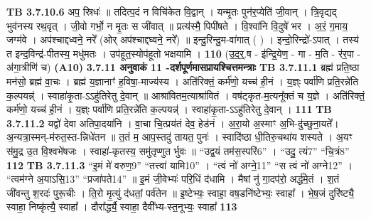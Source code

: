 \documentclass[17pt]{extarticle}
\begin{document}
{{{{{{{{{{{{{{{{{{{                  \newline
                                \textbf{ TB 3.7.10.6} \newline
                  अप॒ स्रिधः॑ ॥ तदित्प॒दं न विचि॑केत वि॒द्वान् । यन्मृ॒तः पुन॑र॒प्येति॑ जी॒वान् । त्रि॒वृद्यद् भुव॑नस्य रथ॒वृत् । जी॒वो गर्भो॒ न मृ॒तः स जी॑वात् ॥ प्रत्य॑स्मै॒ पिपी॑षते । वि॒श्वा॑नि वि॒दुषे॑ भर । अ॒रं॒ ग॒माय॒ जग्म॑वे । अप॑श्चाद्दध्वने॒ नरे᳚ (ओर् अप॑श्चाद्दघ्वने॒ नरे᳚) ॥ इन्दु॒रिन्दु॒म-वा॑गात् ( ) । इन्दो॒रिन्द्रो॑-ऽपात् । तस्य॑ त इन्द॒विन्द्र॑-पीतस्य॒ मधु॑मतः । उप॑हूत॒स्योप॑हूतो भक्षयामि । \textbf{ 110} \newline
                  \newline
                                    (उ॒द॒र्॒.ष - इ॑न्द्रि॒येण॒ - गा - म॒ति - र॑र॒पा - अ॑गा॒त्रीणि॑ च) \textbf{(A10)} \newline \newline
                \textbf{ 3.7.11    अनुवाकं   11 -दर्शपूर्णमासप्रायश्चित्तमन्त्राः} \newline
                                \textbf{ TB 3.7.11.1} \newline
                  ब्रह्म॑ प्रति॒ष्ठा मन॑सो॒ ब्रह्म॑ वा॒चः । ब्रह्म॑ य॒ज्ञानाꣳ॑ ह॒विषा॒-माज्य॑स्य । अति॑रिक्तं॒ कर्म॑णो॒ यच्च॑ ही॒नं । य॒ज्ञ्ः पर्वा॑णि प्रति॒रन्ने॑ति क॒ल्पयन्न्॑ । स्वाहा॑कृ॒ता-ऽऽहु॑तिरेतु दे॒वान् ॥ आश्रा॑वितम॒त्याश्रा॑वितं । वष॑ट्कृत-म॒त्यनू᳚क्तं च य॒ज्ञे । अति॑रिक्तं॒ कर्म॑णो॒ यच्च॑ ही॒नं । य॒ज्ञ्ः पर्वा॑णि प्रति॒रन्ने॑ति क॒ल्पयन्न्॑ । स्वाहा॑कृ॒ता-ऽऽहु॑तिरेतु दे॒वान् । \textbf{ 111} \newline
                  \newline
                                \textbf{ TB 3.7.11.2} \newline
                  यद्वो॑ देवा अतिपा॒दया॑नि । वा॒चा चि॒त्प्रय॑तं देव॒ हेड॑नं । अ॒रा॒यो अ॒स्माꣳ अ॒भि-दु॑च्छुना॒यते᳚। अ॒न्यत्रा॒स्मन्-म॑रुत॒स्त-न्निधे॑तन ॥ त॒तं म॒ आप॒स्तदु॑ तायत॒ पुनः॑ । स्वादि॑ष्ठा धी॒तिरु॒चथा॑य शस्यते । अ॒यꣳ स॑मु॒द्र उ॒त वि॒श्वभे॑षजः । स्वाहा॑-कृतस्य॒ समु॑तृप्णुत र्भुवः ॥ “उद्व॒यं तम॑स॒स्परि॑{6}” । “उदु॒ त्यं{7}” “चि॒त्रं{8}” \textbf{ 112} \newline
                  \newline
                                \textbf{ TB 3.7.11.3} \newline
                  “इ॒मं मे॑ वरुण॒{9}” “तत्त्वा॑ यामि{10}” । “त्वं नो॑ अग्ने॒{11}” “स त्वं नो॑ अग्ने{12}” । “त्वम॑ग्ने अ॒याऽसि॒{13}” “प्रजा॑पते{14}” ॥ इ॒मं जी॒वेभ्यः॑ परि॒धिं द॑धामि । मैषां नु॑ गा॒दप॑रो॒ अर्द्ध॑मे॒तं । श॒तं जी॑वन्तु श॒रदः॑ पुरू॒चीः । ति॒रो मृ॒त्युं द॑धतां॒ पर्व॑तेन ॥ इ॒ष्टेभ्यः॒ स्वाहा॒ वष॒डनि॑ष्टेभ्यः॒ स्वाहा᳚ । भे॒ष॒जं दुरि॑ष्ट्यै॒ स्वाहा॒ निष्कृ॑त्यै॒ स्वाहा᳚ । दौरा᳚र्द्ध्यै॒ स्वाहा॒ दैवी᳚भ्य-स्त॒नूभ्यः॒ स्वाहा᳚ \textbf{ 113} \newline
}}}}}}}}}}}}}}}}}}}
\end{document}
